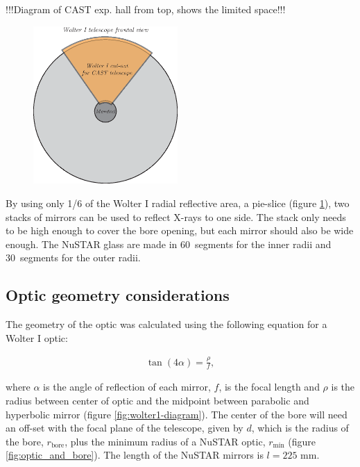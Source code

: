 !!!Diagram of CAST exp. hall from top, shows the limited space!!!

\begin{figure}[htbp]
  \centering
    \includegraphics[height=6cm]{figures/cast/wolter1-cutout.eps}
  \caption{}
  \label{fig:wolter1-cutout}
\end{figure}

By using only 1/6 of the Wolter I radial reflective area, a pie-slice (figure \ref{fig:wolter1-cutout}), two stacks of mirrors can be used to reflect X-rays to one side. The stack only needs to be high enough to cover the bore opening, but each mirror should also be wide enough. The NuSTAR glass are made in 60\degr\ segments for the inner radii and 30\degr\ segments for the outer radii.

\subsection{Optic geometry considerations}
The geometry of the optic was calculated using the following equation for a Wolter I optic:

\begin{eqnarray}\label{eq:wolter}
  \tan(4\alpha) = \frac{\rho}{f},
\end{eqnarray}

where $\alpha$ is the angle of reflection of each mirror, $f$, is the focal length and $\rho$ is the radius between center of optic and the midpoint between parabolic and hyperbolic mirror (figure \ref{fig:wolter1-diagram}). The center of the bore will need an off-set with the focal plane of the telescope, given by $d$, which is the radius of the bore, $r_{\text{bore}}$, plus the minimum radius of a NuSTAR optic, $r_{\text{min}}$ (figure \ref{fig:optic_and_bore}). The length of the NuSTAR mirrors is $l = 225$ mm.

